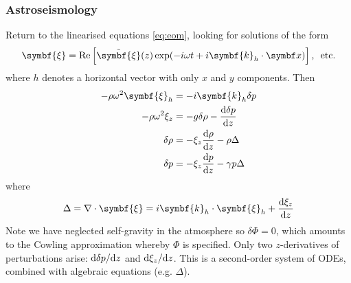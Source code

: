 \documentclass{jknotes}
\newcommand{\disp}{\symbf{\xi}}
\begin{document}
\subsubsection{Astroseismology}
Return to the linearised equations \eqref{eq:eom}, looking for solutions of
the form
\begin{equation}
	\disp = \Re\left[ \tilde{\disp}(z)\exp(-i\omega t + i\symbf{k}_h \cdot
	\x)\right], \,\,\, \text{etc.}
\end{equation}
where $h$ denotes a horizontal vector with only $x$ and $y$ components. Then
\begin{align}
	-\rho \omega^2 \disp_h &= -i\symbf{k}_h \delta p \\
	-\rho \omega^2 \xi_z &= -g \delta \rho - \frac{\diffd \delta p}{\diffd z}
	\\
	\delta \rho &= -\xi_z \frac{\diffd \rho}{\diffd z} - \rho \Delta \\
	\delta p &= -\xi_z \frac{\diffd p}{\diffd z} - \gamma p \Delta
\end{align}
where
\begin{equation}
	\Delta = \nabla \cdot \disp = i\symbf{k}_h \cdot \disp_h + \frac{\diffd
	\xi_z}{\diffd z}
\end{equation}
Note we have neglected self-gravity in the atmosphere so $\delta \Phi = 0$,
which amounts to the Cowling approximation whereby $\Phi$ is specified. Only
two $z$-derivatives of perturbations arise: $\diffd \delta p/\diffd z$ and
$\diffd \xi_z / \diffd z$. This is a second-order system of ODEs, combined
with algebraic equations (e.g. $\Delta$).
\end{document}
